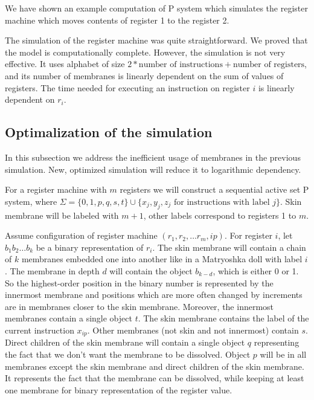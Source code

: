 \documentclass[submission,copyright,creativecommons]{../lib/lncs/llncs}
\begin{document}
\begin{example}
  We have shown an example computation of P system which simulates the register machine which moves contents of register 1 to the register 2.
\end{example}

The simulation of the register machine was quite straightforward. We proved that the model is computationally complete. However, the simulation is not very effective. It uses alphabet of size $2 * \text{number of instructions} + \text{number of registers}$, and its number of membranes is linearly dependent on the sum of values of registers. The time needed for executing an instruction on register $i$ is linearly dependent on $r_i$.


\subsection{Optimalization of the simulation} %
\label{sub:optimalization_of_the_simulation}

In this subsection we address the inefficient usage of membranes in the previous simulation. New, optimized simulation will reduce it to logarithmic dependency.

For a register machine with $m$ registers we will construct a sequential active set P system, where $\Sigma = \{0,1,p,q,s,t\}\cup\{x_j, y_j, z_j \text{~for instructions with label~} j\}$. Skin membrane will be labeled with $m+1$, other labels correspond to registers 1 to $m$.

Assume configuration of register machine $(r_1, r_2, \ldots r_m, ip)$. For register $i$, let $b_1b_2\ldots b_k$ be a binary representation of $r_i$. The skin membrane will contain a chain of $k$ membranes embedded one into another like in a Matryoshka doll with label $i$.
The membrane in depth $d$ will contain the object $b_{k-d}$, which is either 0 or 1. So the highest-order position in the binary number is represented by the innermost membrane and positions which are more often changed by increments are in membranes closer to the skin membrane. Moreover, the innermost membranes contain a single object $t$. The skin membrane contains the label of the current instruction $x_{ip}$. Other membranes (not skin and not innermost) contain $s$. Direct children of the skin membrane will contain a single object $q$ representing the fact that we don't want the membrane to be dissolved. Object $p$ will be in all membranes except the skin membrane and direct children of the skin membrane. It represents the fact that the membrane can be dissolved, while keeping at least one membrane for binary representation of the register value.
\end{document}
